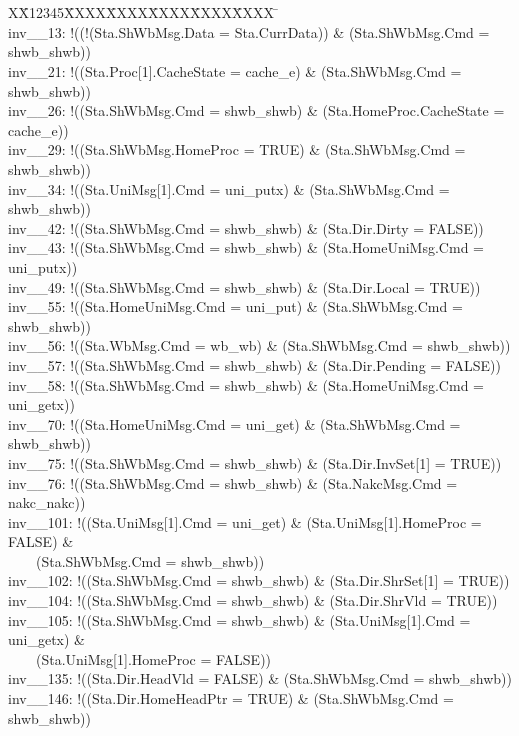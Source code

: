 \documentclass{llncs}
\newlength{\fminilength}
\newenvironment{fmini}[1][\linewidth]
  {\setlength{\fminilength}{#1\fboxsep-2\fboxrule}%
   \vspace{2ex}\noindent\begin{lrbox}{\fminibox}\begin{minipage}{\fminilength}%
   \mbox{ }\hfill\vspace{-2.5ex}}%
  {\end{minipage}\end{lrbox}\vspace{1ex}\hspace{0ex}%
   \framebox{\usebox{\fminibox}}}
\newenvironment{specification}
{\noindent\scriptsize
\tt\begin{fmini}\begin{tabbing}X\=X12345\=XXXX\=XXXX\=XXXX\=XXXX\=XXXX
\=\+\kill} {\end{tabbing}\normalfont\end{fmini}}
\begin{document}
\vspace{-10pt}
\begin{specification}\\
inv\_\_13: !((!(Sta.ShWbMsg.Data = Sta.CurrData)) \& (Sta.ShWbMsg.Cmd = shwb\_shwb))\\
inv\_\_21: !((Sta.Proc[1].CacheState = cache\_e) \& (Sta.ShWbMsg.Cmd = shwb\_shwb))\\
inv\_\_26: !((Sta.ShWbMsg.Cmd = shwb\_shwb) \& (Sta.HomeProc.CacheState = cache\_e))\\
inv\_\_29: !((Sta.ShWbMsg.HomeProc = TRUE) \& (Sta.ShWbMsg.Cmd = shwb\_shwb))\\
inv\_\_34: !((Sta.UniMsg[1].Cmd = uni\_putx) \& (Sta.ShWbMsg.Cmd = shwb\_shwb))\\
inv\_\_42: !((Sta.ShWbMsg.Cmd = shwb\_shwb) \& (Sta.Dir.Dirty = FALSE))\\
inv\_\_43: !((Sta.ShWbMsg.Cmd = shwb\_shwb) \& (Sta.HomeUniMsg.Cmd = uni\_putx))\\
inv\_\_49: !((Sta.ShWbMsg.Cmd = shwb\_shwb) \& (Sta.Dir.Local = TRUE))\\
inv\_\_55: !((Sta.HomeUniMsg.Cmd = uni\_put) \& (Sta.ShWbMsg.Cmd = shwb\_shwb))\\
inv\_\_56: !((Sta.WbMsg.Cmd = wb\_wb) \& (Sta.ShWbMsg.Cmd = shwb\_shwb))\\
inv\_\_57: !((Sta.ShWbMsg.Cmd = shwb\_shwb) \& (Sta.Dir.Pending = FALSE))\\
inv\_\_58: !((Sta.ShWbMsg.Cmd = shwb\_shwb) \& (Sta.HomeUniMsg.Cmd = uni\_getx))\\
inv\_\_70: !((Sta.HomeUniMsg.Cmd = uni\_get) \& (Sta.ShWbMsg.Cmd = shwb\_shwb))\\
inv\_\_75: !((Sta.ShWbMsg.Cmd = shwb\_shwb) \& (Sta.Dir.InvSet[1] = TRUE))\\
inv\_\_76: !((Sta.ShWbMsg.Cmd = shwb\_shwb) \& (Sta.NakcMsg.Cmd = nakc\_nakc))\\
inv\_\_101: !((Sta.UniMsg[1].Cmd = uni\_get) \& (Sta.UniMsg[1].HomeProc = FALSE) \&\\ ~~~~(Sta.ShWbMsg.Cmd = shwb\_shwb))\\
inv\_\_102: !((Sta.ShWbMsg.Cmd = shwb\_shwb) \& (Sta.Dir.ShrSet[1] = TRUE))\\
inv\_\_104: !((Sta.ShWbMsg.Cmd = shwb\_shwb) \& (Sta.Dir.ShrVld = TRUE))\\
inv\_\_105: !((Sta.ShWbMsg.Cmd = shwb\_shwb) \& (Sta.UniMsg[1].Cmd = uni\_getx) \&\\~~~~(Sta.UniMsg[1].HomeProc = FALSE))\\
inv\_\_135: !((Sta.Dir.HeadVld = FALSE) \& (Sta.ShWbMsg.Cmd = shwb\_shwb))\\
inv\_\_146: !((Sta.Dir.HomeHeadPtr = TRUE) \& (Sta.ShWbMsg.Cmd = shwb\_shwb))\\
\end{specification}
\end{document}
